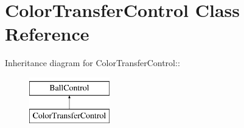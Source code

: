 \hypertarget{classColorTransferControl}{
\section{ColorTransferControl Class Reference}
\label{classColorTransferControl}
}
Inheritance diagram for ColorTransferControl::\begin{figure}[H]
\begin{center}
\leavevmode
\includegraphics[height=2cm]{classColorTransferControl}
\end{center}
\end{figure}
